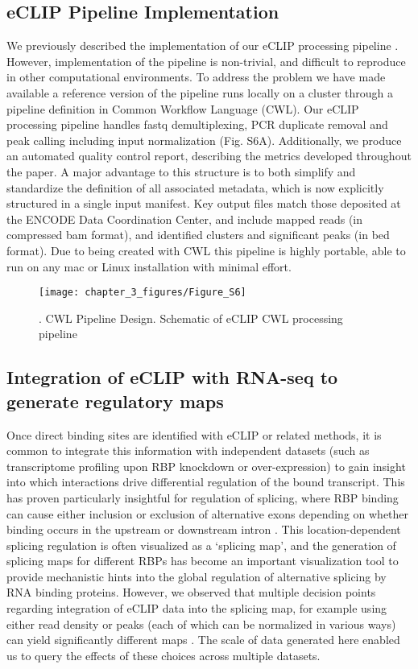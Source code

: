 \subsection{eCLIP Pipeline Implementation}
We previously described the implementation of our eCLIP processing pipeline \cite{VanNostrand2016}. However, implementation of the pipeline is non-trivial, and difficult to reproduce in other computational environments. To address the problem we have made available a reference version of the pipeline runs locally on a cluster through a pipeline definition in Common Workflow Language (CWL). Our eCLIP processing pipeline handles fastq demultiplexing, PCR duplicate removal and peak calling including input normalization (Fig. S6A). Additionally, we produce an automated quality control report, describing the metrics developed throughout the paper. A major advantage to this structure is to both simplify and standardize the definition of all associated metadata, which is now explicitly structured in a single input manifest. Key output files match those deposited at the ENCODE Data Coordination Center, and include mapped reads (in compressed bam format), and identified clusters and significant peaks (in bed format). Due to being created with CWL this pipeline is highly portable, able to run on any mac or Linux installation with minimal effort. 

\begin{figure}[ht]
  \centering
  \texttt{[image: chapter\_3\_figures/Figure\_S6]}
  \caption[Supplementary Figure 5]{. CWL Pipeline Design. Schematic of eCLIP CWL processing pipeline}
  \label{fig:Figure_S6}
\end{figure}

\subsection{Integration of eCLIP with RNA-seq to generate regulatory maps}
Once direct binding sites are identified with eCLIP or related methods, it is common to integrate this information with independent datasets (such as transcriptome profiling upon RBP knockdown or over-expression) to gain insight into which interactions drive differential regulation of the bound transcript. This has proven particularly insightful for regulation of splicing, where RBP binding can cause either inclusion or exclusion of alternative exons depending on whether binding occurs in the upstream or downstream intron \cite{Yeo2009}. This location-dependent splicing regulation is often visualized as a ‘splicing map’, and the generation of splicing maps for different RBPs has become an important visualization tool to provide mechanistic hints into the global regulation of alternative splicing by RNA binding proteins. However, we observed that multiple decision points regarding integration of eCLIP data into the splicing map, for example using either read density or peaks (each of which can be normalized in various ways) can yield significantly different maps \cite{Witten2011,Huelga2012}. The scale of data generated here enabled us to query the effects of these choices across multiple datasets.

